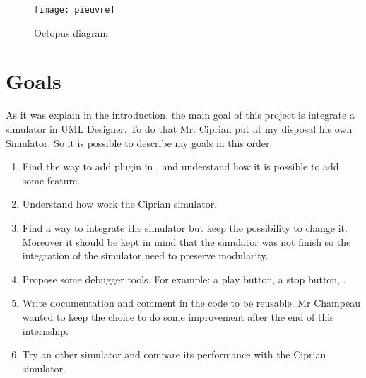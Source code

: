\begin{figure}[!h]
  \centering
  \texttt{[image: pieuvre]}
  \caption{Octopus diagram}
  \label{fig:octopus}
\end{figure}

\newpage
\section{Goals}

As it was explain in the introduction, the main goal of this project is integrate a simulator in UML Designer. To do that Mr. Ciprian put at my disposal his own Simulator. So it is possible to describe my goals in this order:

\begin{enumerate}
\item Find the way to add plugin in \umld, and understand how it is possible to add some feature.
\item Understand how work the Ciprian simulator.
\item Find a way to integrate the simulator but keep the possibility to change it. Moreover it should be kept in mind that the simulator was not finish so the integration of the simulator need to preserve modularity.
\item Propose some debugger tools. For example: a play button, a stop button, \etc.
\item Write documentation and comment in the code to be reusable. Mr Champeau wanted to keep the choice to do some improvement after the end of this internship.
\item Try an other simulator and compare its performance with the Ciprian simulator.
\end{enumerate}









